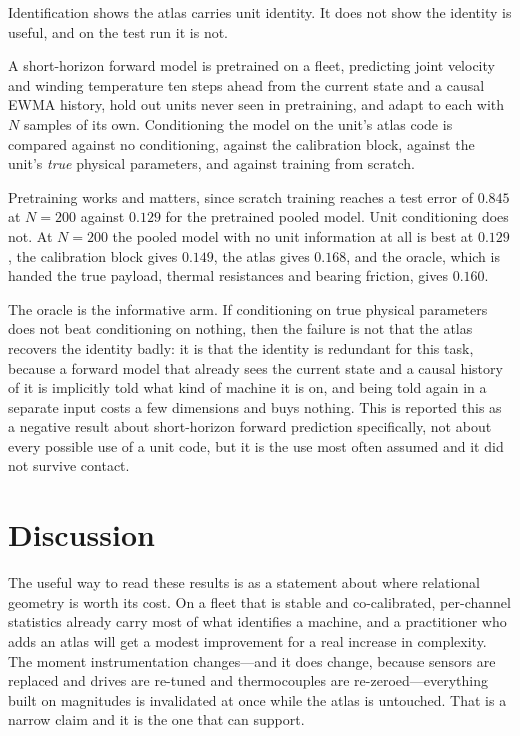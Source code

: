 \documentclass[11pt]{article}
\begin{document}
Identification shows the atlas carries unit identity. It does not show the
identity is useful, and on the test run it is not.

A short-horizon forward model is pretrained on a fleet, predicting joint velocity
and winding temperature ten steps ahead from the current state and a causal
EWMA history, hold out units never seen in pretraining, and adapt to each with
$N$ samples of its own. Conditioning the model on the unit's atlas code is
compared against no conditioning, against the calibration block, against the
unit's \emph{true} physical parameters, and against training from scratch.

Pretraining works and matters, since scratch training reaches a test error of
$0.845$ at $N=200$ against $0.129$ for the pretrained pooled model. Unit
conditioning does not. At $N=200$ the pooled model with no unit information at
all is best at $0.129$, the calibration block gives $0.149$, the atlas gives
$0.168$, and the oracle, which is handed the true payload, thermal resistances
and bearing friction, gives $0.160$.

The oracle is the informative arm. If conditioning on true physical parameters
does not beat conditioning on nothing, then the failure is not that the atlas
recovers the identity badly: it is that the identity is redundant for this
task, because a forward model that already sees the current state and a causal
history of it is implicitly told what kind of machine it is on, and being told
again in a separate input costs a few dimensions and buys nothing. This is reported
this as a negative result about short-horizon forward prediction specifically,
not about every possible use of a unit code, but it is the use most often
assumed and it did not survive contact.

\section{Discussion}

The useful way to read these results is as a statement about where relational
geometry is worth its cost. On a fleet that is stable and co-calibrated,
per-channel statistics already carry most of what identifies a machine, and a
practitioner who adds an atlas will get a modest improvement for a real
increase in complexity. The moment instrumentation changes---and it does
change, because sensors are replaced and drives are re-tuned and thermocouples
are re-zeroed---everything built on magnitudes is invalidated at once while
the atlas is untouched. That is a narrow claim and it is the one that can
support.
\end{document}
